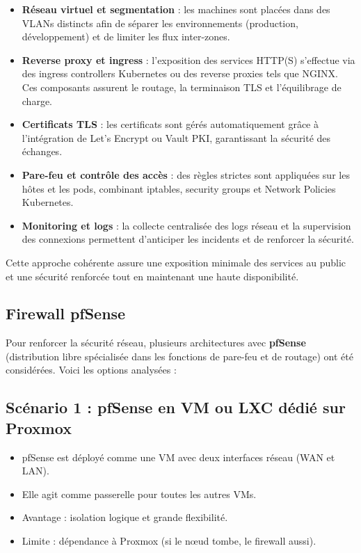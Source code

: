 \begin{itemize}
	\item \textbf{Réseau virtuel et segmentation} : les machines sont placées dans des VLANs distincts afin de séparer les environnements (production, développement) et de limiter les flux inter-zones.
	\item \textbf{Reverse proxy et ingress} : l’exposition des services HTTP(S) s’effectue via des ingress controllers Kubernetes ou des reverse proxies tels que NGINX. Ces composants assurent le routage, la terminaison TLS et l’équilibrage de charge.
	\item \textbf{Certificats TLS} : les certificats sont gérés automatiquement grâce à l’intégration de Let’s Encrypt ou Vault PKI, garantissant la sécurité des échanges.
	\item \textbf{Pare-feu et contrôle des accès} : des règles strictes sont appliquées sur les hôtes et les pods, combinant iptables, security groups et Network Policies Kubernetes.
	\item \textbf{Monitoring et logs} : la collecte centralisée des logs réseau et la supervision des connexions permettent d’anticiper les incidents et de renforcer la sécurité.
\end{itemize}

Cette approche cohérente assure une exposition minimale des services au public et une sécurité renforcée tout en maintenant une haute disponibilité.

\subsection{Firewall pfSense}

Pour renforcer la sécurité réseau, plusieurs architectures avec \textbf{pfSense} (distribution libre spécialisée dans les fonctions de pare-feu et de routage) ont été considérées. Voici les options analysées :

\subsection{Scénario 1 : pfSense en VM ou LXC dédié sur Proxmox}

\begin{itemize}
	\item pfSense est déployé comme une VM avec deux interfaces réseau (WAN et LAN).
	\item Elle agit comme passerelle pour toutes les autres VMs.
	\item Avantage : isolation logique et grande flexibilité.
	\item Limite : dépendance à Proxmox (si le nœud tombe, le firewall aussi).
\end{itemize}

